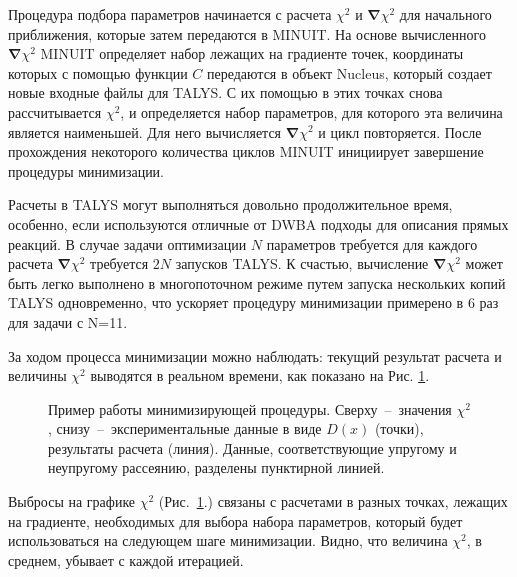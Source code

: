 \documentclass[a4paper,12pt]{extarticle}
\begin{document}
Процедура подбора параметров начинается с расчета $\chi^2$ и $\mathbf{\nabla} \chi^2$ для начального приближения, которые затем передаются в MINUIT. На основе вычисленного $\mathbf{\nabla} \chi^2$ MINUIT определяет набор лежащих на градиенте точек, координаты которых с помощью функции $C$ передаются в объект Nucleus, который создает новые входные файлы для TALYS. С их помощью в этих точках снова рассчитывается $\chi^2$, и определяется набор параметров, для которого эта величина является наименьшей. Для него вычисляется $\mathbf{\nabla} \chi^2$ и цикл повторяется. После прохождения некоторого количества циклов MINUIT инициирует завершение процедуры минимизации. 

Расчеты в TALYS могут выполняться довольно продолжительное время, особенно, если используются отличные от DWBA подходы для описания прямых реакций. В случае задачи оптимизации $N$ параметров требуется для каждого расчета $\mathbf{\nabla} \chi^2$ требуется $2N$ запусков TALYS. К счастью, вычисление  $\mathbf{\nabla} \chi^2$ может быть легко выполнено в многопоточном режиме путем запуска нескольких копий TALYS одновременно, что ускоряет процедуру минимизации примерено в 6 раз для задачи с N=11. 

За ходом процесса минимизации можно наблюдать: текущий результат расчета и величины $\chi^2$ выводятся в реальном времени, как показано на Рис. \ref{fig:MinimizationPicture}.
 \begin{figure}
\caption{Пример работы минимизирующей процедуры. Сверху~--~значения $\chi^2$, снизу~--~экспериментальные данные в виде $D(x)$ (точки), результаты расчета (линия). Данные, соответствующие упругому и неупругому рассеянию, разделены пунктирной линией.}
\label{fig:MinimizationPicture}
\end{figure}
Выбросы на графике $\chi^2$ (Рис.~\ref{fig:MinimizationPicture}.) связаны с расчетами в разных точках, лежащих на градиенте, необходимых для выбора набора параметров, который будет использоваться на следующем шаге минимизации. Видно, что величина $\chi^2$, в среднем, убывает с каждой итерацией.
\end{document}
